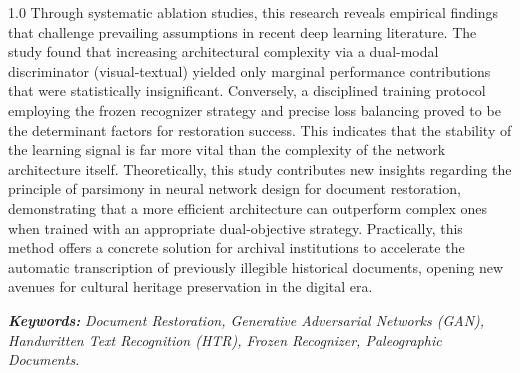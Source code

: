 \begin{spacing}{1.0}
{    Through systematic ablation studies, this research reveals empirical findings that challenge prevailing assumptions in recent deep learning literature. The study found that increasing architectural complexity via a dual-modal discriminator (visual-textual) yielded only marginal performance contributions that were statistically insignificant. Conversely, a disciplined training protocol employing the frozen recognizer strategy and precise loss balancing proved to be the determinant factors for restoration success. This indicates that the stability of the learning signal is far more vital than the complexity of the network architecture itself.
    Theoretically, this study contributes new insights regarding the principle of parsimony in neural network design for document restoration, demonstrating that a more efficient architecture can outperform complex ones when trained with an appropriate dual-objective strategy. Practically, this method offers a concrete solution for archival institutions to accelerate the automatic transcription of previously illegible historical documents, opening new avenues for cultural heritage preservation in the digital era.}
\end{spacing}

\vspace{1\baselineskip}

\noindent
\textbf{\textit{Keywords:}} \textit{Document Restoration, Generative Adversarial Networks (GAN), Handwritten Text Recognition (HTR), Frozen Recognizer, Paleographic Documents.}

% 